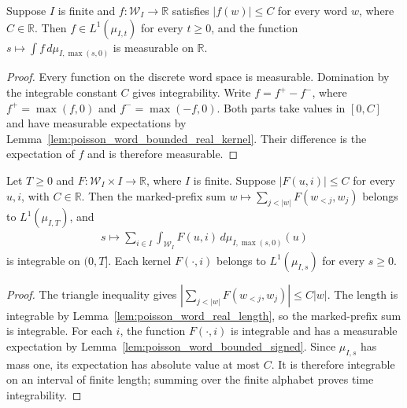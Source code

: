 \begin{lemma}
\label{lem:poisson_word_bounded_signed}
\leanok
{}
Suppose $I$ is finite and $f:\mathcal W_I\to\mathbb R$ satisfies
$|f(w)|\leq C$ for every word $w$, where $C\in\mathbb R$.
Then $f\in L^1(\mu_{I,t})$ for every $t\geq0$, and the function
$s\mapsto\int f\,d\mu_{I,\max(s,0)}$ is measurable on $\mathbb R$.
\end{lemma}
\begin{proof}
\leanok
{}
Every function on the discrete word space is measurable.  Domination
by the integrable constant $C$ gives integrability.  Write
$f=f^+-f^-$, where $f^+=\max(f,0)$ and $f^-=\max(-f,0)$.
Both parts take values in $[0,C]$ and have measurable expectations by
Lemma~\ref{lem:poisson_word_bounded_real_kernel}.  Their difference is
the expectation of $f$ and is therefore measurable.
\end{proof}

\begin{theorem}
\label{thm:poisson_word_signed_integrability}
\leanok
{}
Let $T\geq0$ and $F:\mathcal W_I\times I\to\mathbb R$, where $I$ is
finite.  Suppose $|F(u,i)|\leq C$ for every $u,i$, with $C\in\mathbb R$.
Then the marked-prefix sum
$w\mapsto\sum_{j<|w|}F(w_{<j},w_j)$ belongs to $L^1(\mu_{I,T})$,
and
\begin{align}
 s\longmapsto\sum_{i\in I}\int_{\mathcal W_I}
 F(u,i)\,d\mu_{I,\max(s,0)}(u)
 \label{eq:poisson_jump_time_integrand}
\end{align}
is integrable on $(0,T]$.  Each kernel $F(\cdot,i)$ belongs to
$L^1(\mu_{I,s})$ for every $s\geq0$.
\end{theorem}
\begin{proof}
\leanok
{}
The triangle inequality gives
$|\sum_{j<|w|}F(w_{<j},w_j)|\leq C|w|$.
The length is integrable by Lemma~\ref{lem:poisson_word_real_length},
so the marked-prefix sum is integrable.  For each $i$, the function
$F(\cdot,i)$ is integrable and has a measurable expectation by
Lemma~\ref{lem:poisson_word_bounded_signed}.  Since $\mu_{I,s}$ has
mass one, its expectation has absolute value at most $C$.
It is therefore integrable on an interval of finite length; summing
over the finite alphabet proves time integrability.
\end{proof}

